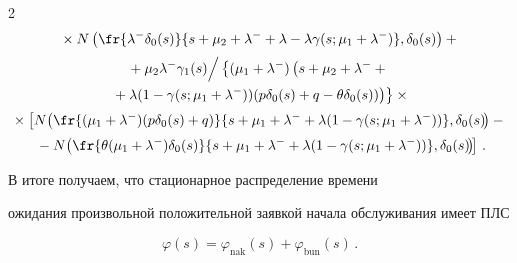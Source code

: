 \begin{multicols}{2}
\begin{multline*}
{}\times


N \left ( \fr{ \lambda^- \delta_0(s)  }{


s+\mu_2+\lambda^- + \lambda - \lambda \gamma(s; \mu_1+ \lambda^-)}, \delta_0(s)


\right )+{}


\\[2pt]


{}+


{ \mu_2 \lambda^- \gamma_1(s)}\Big /\left\{(\mu_1+\lambda^-)\left(s + \mu_2 + \lambda^- +{}\right.\right.\\


\left.\left.{}+ \lambda (1 - \gamma(s;\mu_1 + \lambda^-))(p \delta_0(s)  


+q- \theta \delta_0(s))\right)\right\}


\times{}


\\[2pt]


{}\times \left [


N \!\left ( \fr{ (\mu_1+\lambda^-)(p \delta_0(s)  +q)  }{


s + \mu_1 + \lambda^- + \lambda (1 - \gamma(s;\mu_1 + \lambda^-))}, \delta_0(s)


\!\right )


- {}\right.\\[2pt]


\!\!\left.{}-


N\! \left (


\fr{ \theta(\mu_1+\lambda^-)  \delta_0(s)   }{


s + \mu_1 + \lambda^- + \lambda (1 - \gamma(s;\mu_1 + \lambda^-))}, \delta_0(s)


\!\right )\! \right ]\,.\hspace*{-3.9619pt}


\end{multline*}





В итоге получаем, что стационарное распределение времени


ожидания произвольной положительной заявкой начала обслуживания имеет ПЛС


\begin{equation*}


\varphi(s) = \varphi_{\mathrm{nak}}(s) + \varphi_{\mathrm{bun}}(s)\,.


\end{equation*}






\end{multicols}

